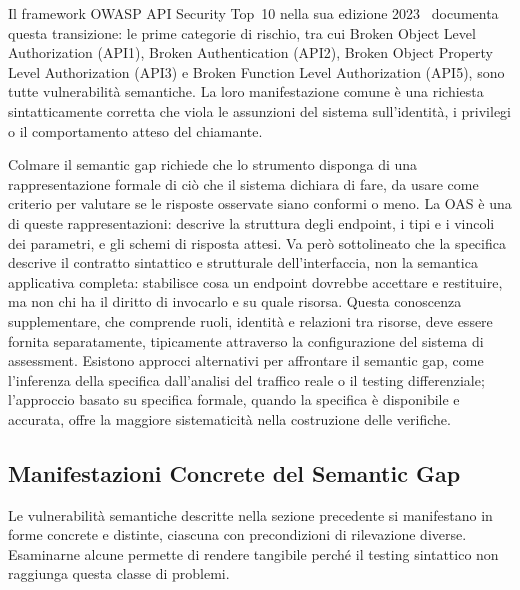Il framework \gls{OWASP} API Security Top~10 nella sua edizione 2023~\cite{OWASPTop10} documenta questa transizione: le prime categorie di rischio, tra cui Broken Object Level Authorization (API1), Broken Authentication (API2), Broken Object Property Level Authorization (API3) e Broken Function Level Authorization (API5), sono tutte vulnerabilità semantiche. La loro manifestazione comune è una richiesta sintatticamente corretta che viola le assunzioni del sistema sull'identità, i privilegi o il comportamento atteso del chiamante.

Colmare il semantic gap richiede che lo strumento disponga di una rappresentazione formale di ciò che il sistema dichiara di fare, da usare come criterio per valutare se le risposte osservate siano conformi o meno. La \gls{OAS} è una di queste rappresentazioni: descrive la struttura degli endpoint, i tipi e i vincoli dei parametri, e gli schemi di risposta attesi. Va però sottolineato che la specifica descrive il contratto sintattico e strutturale dell'interfaccia, non la semantica applicativa completa: stabilisce cosa un endpoint dovrebbe accettare e restituire, ma non chi ha il diritto di invocarlo e su quale risorsa. Questa conoscenza supplementare, che comprende ruoli, identità e relazioni tra risorse, deve essere fornita separatamente, tipicamente attraverso la configurazione del sistema di assessment. Esistono approcci alternativi per affrontare il semantic gap, come l'inferenza della specifica dall'analisi del traffico reale o il testing differenziale; l'approccio basato su specifica formale, quando la specifica è disponibile e accurata, offre la maggiore sistematicità nella costruzione delle verifiche.


\subsection{Manifestazioni Concrete del Semantic Gap}\label{subsec:categorie-fallimento}

Le vulnerabilità semantiche descritte nella sezione precedente si manifestano in forme concrete e distinte, ciascuna con precondizioni di rilevazione diverse. Esaminarne alcune permette di rendere tangibile perché il testing sintattico non raggiunga questa classe di problemi.

